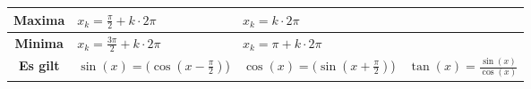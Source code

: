 \begin{tabularx}{1\textwidth} {
    | >{\raggedright\arraybackslash}c
    | >{\raggedright\arraybackslash}X
    | >{\raggedright\arraybackslash}X
    | >{\raggedright\arraybackslash}X |}
  \textbf{Maxima}             & $x_k = \frac{\pi}{2} + k \cdot 2\pi$                                 & $x_k = k \cdot 2\pi$                                                         &                                                                                        \\ \hline
  \textbf{Minima}             & $x_k = \frac{3\pi}{2} + k \cdot 2\pi$                                & $x_k = \pi + k \cdot 2\pi$                                                   &                                                                                        \\ \hline
  \textbf{Es gilt}            & $\sin(x)=(\cos(x-\frac{\pi}{2})$)                                    & $\cos(x)=(\sin(x+\frac{\pi}{2})$)                                            & $\tan(x)=\frac{\sin(x)}{\cos(x)}$                                                      \\ \hline
\end{tabularx}

\newpage

